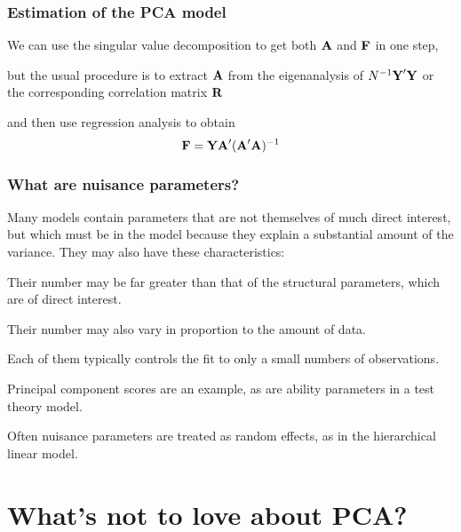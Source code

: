 \documentclass[11pt]{beamer}
\begin{document}

\begin{frame}

\frametitle{Estimation of the PCA model}

\bi
  \item We can use the singular value decomposition to get both $\mbox{\bf A}$ and $\mbox{\bf F}$ in one step,
  \item but the usual procedure is to extract $\mbox{\bf A}$ from the eigenanalysis of $N^{-1} \mbox{\bf Y}' \mbox{\bf Y}$
  or the corresponding correlation matrix $\mbox{\bf R}$
  \item and then use regression analysis to obtain
  \[
    \mbox{\bf F} = \mbox{\bf Y} \mbox{\bf A}' (\mbox{\bf A}' \mbox{\bf A})^{-1}
  \]
\ei

\end{frame}


\begin{frame}

\frametitle{What are nuisance parameters?}

\bi
  \item Many models contain parameters that are not themselves of much direct interest, but which must be in the model because they explain a substantial amount of the variance. They may also have these characteristics:
  \bi
    \item Their number may be far greater than that of the structural parameters, which are of direct interest.
    \item Their number may also vary in proportion to the amount of data.
    \item Each of them typically controls the fit to only a small numbers of observations.
  \ei
  \item Principal component scores are an example, as are ability parameters in a test theory model.
  \item Often nuisance parameters are treated as random effects, as in the hierarchical linear model.
\ei
\end{frame}


\section[PCA Limitations]{What's not to love about PCA?}
\end{document}
